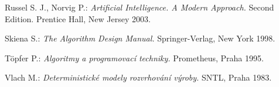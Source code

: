 \documentclass[12pt,notitlepage,fleqn]{report} %
\theoremstyle{definition}
\begin{document}
\begin{thebibliography}{99}
  Russel S. J., Norvig P.: \emph{Artificial Intelligence. A Modern Approach.} Second Edition. Prentice Hall, New Jersey 2003. 
 
  Skiena S.: \emph{The Algorithm Design Manual.} Springer-Verlag, New York 1998.
 
  Töpfer P.: \emph{Algoritmy a programovací techniky.} Prometheus, Praha 1995.
 
  Vlach M.: \emph{Deterministické modely rozvrhování výroby.} SNTL, Praha 1983.
 
\end{thebibliography}
\end{document}
